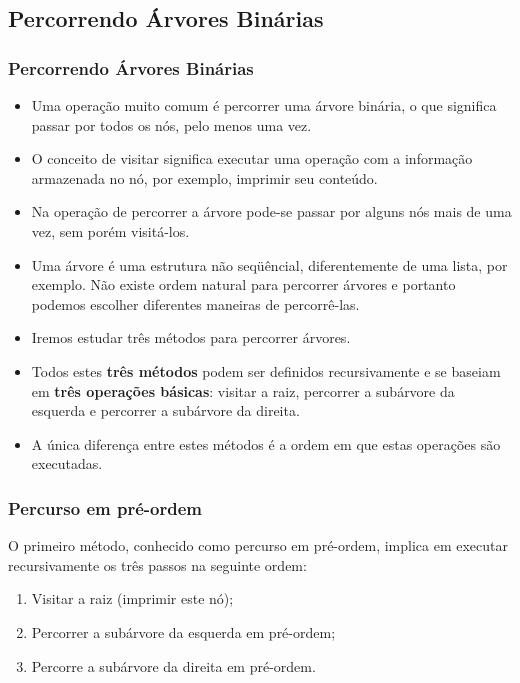 \subsection{Percorrendo Árvores Binárias}
\begin{frame}
  \frametitle{Percorrendo Árvores Binárias}

\begin{itemize}
  \item Uma operação muito comum é percorrer uma árvore binária, o que significa passar por todos os nós, pelo menos uma vez.

 \item  O conceito de visitar significa executar uma operação com a informação armazenada no nó, por exemplo, imprimir seu conteúdo. 

 \item Na operação de percorrer a árvore pode-se passar por alguns nós mais de uma vez, sem porém visitá-los.

 \item Uma árvore é uma estrutura não seqüêncial, diferentemente de uma lista, por exemplo. Não existe ordem natural para percorrer árvores e portanto podemos escolher diferentes maneiras de percorrê-las. 

 \item  Iremos estudar três métodos para percorrer árvores. 

 \item Todos estes \textbf{três métodos} podem ser definidos recursivamente e se baseiam em \textbf{três operações básicas}: visitar a raiz, percorrer a subárvore da esquerda e percorrer a subárvore da direita. 

 \item A única diferença entre estes métodos é a ordem em que estas operações são executadas.
\end{itemize}

\end{frame}

\begin{frame}
  
  \frametitle{Percurso em pré-ordem}
  
O primeiro método, conhecido como percurso em pré-ordem, implica em executar 
recursivamente os três passos na seguinte ordem: 
 
\begin{enumerate}
  \item Visitar a raiz (imprimir este nó);
 \item Percorrer a subárvore da esquerda em pré-ordem;
 \item Percorre a subárvore da direita em pré-ordem.

\end{enumerate}

\end{frame}


